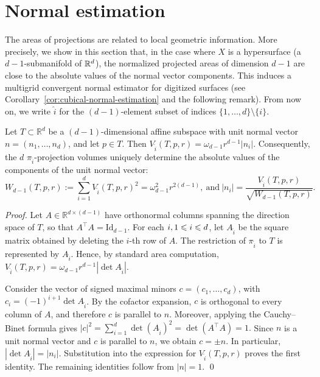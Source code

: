 \section{Normal estimation}
\label{sec-normals}

The areas of projections are related to local geometric
information. More precisely, we show in this section that, in the case
where $X$ is a hypersurface (a $d-1$-submanifold of $\mathbb{R}^d$), the
normalized projected areas of dimension $d-1$ are close to the
absolute values of the normal vector components. This induces a
multigrid convergent normal estimator for digitized surfaces (see
Corollary~\ref{cor:cubical-normal-estimation} and the following
remark). From now on, we write $\widehat{i}$ for the $(d-1)$-element subset of
indices $\{1,\ldots,d\} \setminus \{ i \}$.

\begin{theorem}
\label{thm:normal-recovery}
Let $T\subset\mathbb R^d$ be a $(d-1)$-dimensional affine subspace
with unit normal vector $n=(n_1,\ldots,n_d)$, and let $p \in T$.
Then \( V_{\widehat{i}}(T,p,r)=\omega_{d-1}r^{d-1}|n_i|. \)
Consequently, the $d$ $\pi_{\widehat{i}}$-projection volumes uniquely
determine the absolute values of the components
of the unit normal vector:
\[
W_{d-1}(T,p,r) := \sum_{i=1}^d V_{\widehat{i}}(T,p,r)^2
=
\omega_{d-1}^2r^{2(d-1)},
~\text{and}~
|n_i|=\frac{V_{\widehat{i}}(T,p,r)}
{\sqrt{W_{d-1}(T,p,r)}}.
\]
\end{theorem}

\begin{proof}
Let $A\in\mathbb R^{d\times(d-1)}$ have orthonormal columns spanning
the direction space of $T$, so that $A^\top A=\mathrm{Id}_{d-1}$.  For each $i, 1\leqslant i \leqslant
d$, let $A_{\widehat i}$ be the square matrix obtained by deleting the
$i$-th row of $A$.  The restriction of $\pi_{\widehat i}$ to $T$ is
represented by $A_{\widehat i}$.  Hence, by standard area computation, 
\(
V_{\widehat{i}}(T,p,r)=\omega_{d-1}r^{d-1}|\det A_{\widehat i}|.
\)

\begin{sloppypar}
Consider the vector of signed maximal minors $c=(c_1,\ldots,c_d)$,
with $c_i = (-1)^{i+1} \det A_{\widehat i}$.  By the cofactor expansion,
$c$ is orthogonal to every column of $A$, and therefore $c$ is
parallel to $n$.
Moreover, applying the Cauchy--Binet formula gives
\(
|c|^2
=
\sum_{i=1}^d\det(A_{\widehat i})^2
=
\det(A^\top A)=1.
\)
Since $n$ is a unit normal vector and $c$ is parallel to $n$, we obtain
$c=\pm n$. In particular,
\(
|\det A_{\widehat i}|=|n_i|.
\)
Substitution into the expression for $V_{\widehat{i}}(T,p,r)$
proves the first identity. The remaining
identities follow from $|n|=1$. \qed
\end{sloppypar}
\end{proof}




